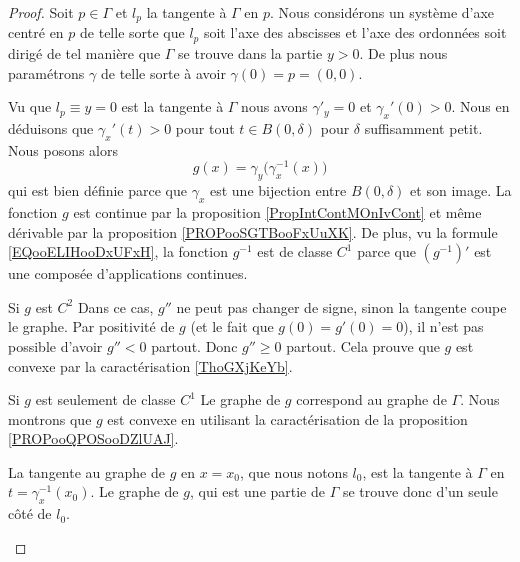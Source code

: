 \begin{proof}
    Soit \( p\in \Gamma\) et \( l_p\) la tangente à \( \Gamma\) en \( p\). Nous considérons un système d'axe centré en \( p\) de telle sorte que \( l_p\) soit l'axe des abscisses et l'axe des ordonnées soit dirigé de tel manière que \( \Gamma\) se trouve dans la partie \( y>0\). De plus nous paramétrons \( \gamma\) de telle sorte à avoir \( \gamma(0)=p=(0,0)\).

    Vu que \( l_p\equiv y=0\) est la tangente à \( \Gamma\) nous avons \( \gamma'_y=0\) et \( \gamma_x'(0)>0\). Nous en déduisons que \( \gamma_x'(t)>0\) pour tout \( t\in B(0,\delta)\) pour \( \delta\) suffisamment petit. Nous posons alors
    \begin{equation}
        g(x)=\gamma_y\big( \gamma_x^{-1}(x) \big)
    \end{equation}
    qui est bien définie parce que \( \gamma_x\) est une bijection entre \( B(0,\delta)\) et son image. La fonction \( g\) est continue par la proposition \ref{PropIntContMOnIvCont} et même dérivable par la proposition \ref{PROPooSGTBooFxUuXK}. De plus, vu la formule \eqref{EQooELIHooDxUFxH}, la fonction \( g^{-1}\) est de classe \( C^1\) parce que \( (g^{-1})'\) est une composée d'applications continues.

    \begin{subproof}
        \item[Si \( g\) est \( C^2\)]
            Dans ce cas, \( g''\) ne peut pas changer de signe, sinon la tangente coupe le graphe. Par positivité de \( g\) (et le fait que \( g(0)=g'(0)=0\)), il n'est pas possible d'avoir \( g''<0\) partout. Donc \( g''\geq 0\) partout. Cela prouve que \( g\) est convexe par la caractérisation \ref{ThoGXjKeYb}.
        \item[Si \( g\) est seulement de classe \( C^1\)]
            Le graphe de \( g\) correspond au graphe de \( \Gamma\). Nous montrons que \( g\) est convexe en utilisant la caractérisation de la proposition \ref{PROPooQPOSooDZlUAJ}.
    
            La tangente au graphe de \( g\) en \( x=x_0\), que nous notons \( l_0\), est la tangente à \( \Gamma\) en \( t=\gamma_x^{-1}(x_0)\). Le graphe de \( g\), qui est une partie de \( \Gamma\) se trouve donc d'un seule côté de \(l_0\).


\end{subproof}
\end{proof}
